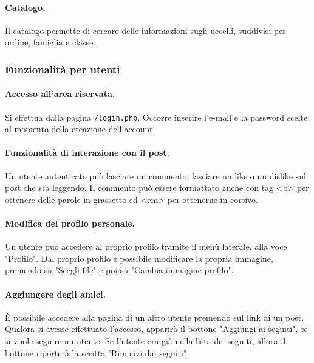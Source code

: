 \documentclass[12pt, a4paper]{article}
\begin{document}
    \paragraph{Catalogo.} Il catalogo permette di cercare delle informazioni sugli uccelli, suddivisi per ordine, famiglia e classe.

    \subsubsection{Funzionalità per utenti}

    \paragraph{Accesso all'area riservata.}
    Si effettua dalla pagina \texttt{/login.php}. Occorre inserire l'e-mail e la password scelte al momento della creazione dell'account.

    \paragraph{Funzionalità di interazione con il post.} Un utente autenticato può lasciare un commento, lasciare un like o un dislike sul post che sta leggendo. Il commento può essere formattato anche con tag <b> per ottenere delle parole in grassetto ed <em> per ottenerne in corsivo.

    \paragraph{Modifica del profilo personale.}
    Un utente può accedere al proprio profilo tramite il menù laterale, alla voce "Profilo". Dal proprio profilo è possibile modificare la propria immagine, premendo su "Scegli file" e poi su "Cambia immagine profilo".

    \paragraph{Aggiungere degli amici.} È possibile accedere alla pagina di un altro utente premendo sul link di un post. Qualora si avesse effettuato l'accesso, apparirà il bottone "Aggiungi ai seguiti", se si vuole seguire un utente. Se l'utente era già nella lista dei seguiti, allora il bottone riporterà la scritta "Rimuovi dai seguiti".
\end{document}
